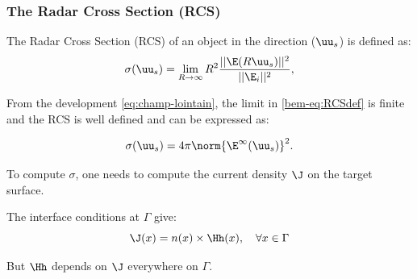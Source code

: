 \documentclass[beamer]{standalone}
\begin{document}


\begin{frame}
    \frametitle{The Radar Cross Section (RCS)}
    The Radar Cross Section (RCS) of an object in the direction ($\uu_s$) is defined as:
    \begin{equation}
    \label{bem-eq:RCSdef}
    \sigma(\uu_s)= \lim\limits_{R\to\infty} R^2\frac{||\E(R\uu_s)||^2}{||\E_i||^2},
\end{equation}
%
\pause

From the development \eqref{eq:champ-lointain}, the limit in \eqref{bem-eq:RCSdef} is finite and the RCS is well defined and can be expressed as:

    
\begin{equation}
    \sigma(\uu_s) =  4\pi\norm{\E^\infty(\uu_s)}^2.
\end{equation}

\pause

To compute $\sigma$, one needs to compute the current density $\J$ on the target surface.

The interface conditions at $\Gamma$ give:
\begin{equation}
    \J(x) = n(x)\times\Hh(x),\quad\forall x\in\Gamma
\end{equation}

But $\Hh$ depends on $\J$ everywhere on $\Gamma$.
\end{frame}
\end{document}
